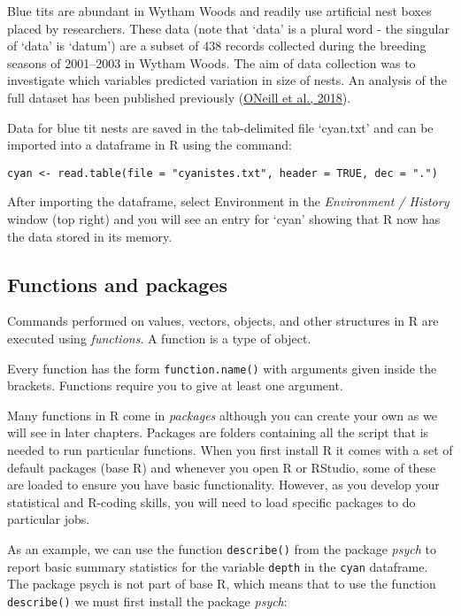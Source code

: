 \documentclass[
]{book}
\begin{document}
Blue tits are abundant in Wytham Woods and readily use artificial nest
boxes placed by researchers. These data (note that `data' is a plural
word - the singular of `data' is `datum') are a subset of 438 records
collected during the breeding seasons of 2001--2003 in Wytham Woods. The
aim of data collection was to investigate which variables predicted
variation in size of nests. An analysis of the full dataset has been
published previously (\protect\hyperlink{ref-O_Neill_2018}{ONeill et
al., 2018}).

Data for blue tit nests are saved in the tab-delimited file `cyan.txt'
and can be imported into a dataframe in R using the command:

\texttt{cyan\ \textless{}-\ read.table(file\ =\ "cyanistes.txt",\ header\ =\ TRUE,\ dec\ =\ ".")}

After importing the dataframe, select Environment in the
\emph{Environment / History} window (top right) and you will see an
entry for `cyan' showing that R now has the data stored in its memory.

\hypertarget{functions}{%
\subsection{Functions and packages}\label{functions}}

Commands performed on values, vectors, objects, and other structures in
R are executed using \emph{functions}. A function is a type of object.

Every function has the form \texttt{function.name()} with arguments
given inside the brackets. Functions require you to give at least one
argument.

Many functions in R come in \emph{packages} although you can create your
own as we will see in later chapters. Packages are folders containing
all the script that is needed to run particular functions. When you
first install R it comes with a set of default packages (base R) and
whenever you open R or RStudio, some of these are loaded to ensure you
have basic functionality. However, as you develop your statistical and
R-coding skills, you will need to load specific packages to do
particular jobs.

As an example, we can use the function \texttt{describe()} from the
package \emph{psych} to report basic summary statistics for the variable
\texttt{depth} in the \texttt{cyan} dataframe. The package psych is not
part of base R, which means that to use the function \texttt{describe()}
we must first install the package \emph{psych}:
\end{document}
